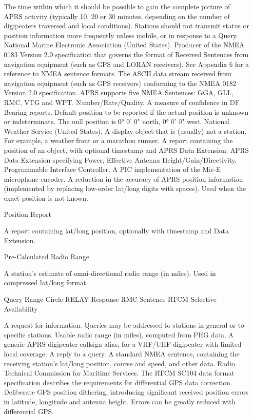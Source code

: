 {The time within which it should be possible to gain the complete picture of APRS
activity (typically 10, 20 or 30 minutes, depending on the number of digipeaters
traversed and local conditions). Stations should not transmit status or position
information more frequently unless mobile, or in response to a Query.
National Marine Electronic Association (United States). Producer of the NMEA 0183
Version 2.0 specification that governs the format of Received Sentences from
navigation equipment (such as GPS and LORAN receivers). See Appendix 6 for a
reference to NMEA sentence formats.
The ASCII data stream received from navigation equipment (such as GPS receivers)
conforming to the NMEA 0182 Version 2.0 specification. APRS supports five NMEA
Sentences: GGA, GLL, RMC, VTG and WPT.
Number/Rate/Quality. A measure of confidence in DF Bearing reports.
Default position to be reported if the actual position is unknown or indeterminate. The
null position is 0° 0' 0" north, 0° 0' 0" west.
National Weather Service (United States).
A display object that is (usually) not a station. For example, a weather front or a
marathon runner.
A report containing the position of an object, with optional timestamp and APRS Data
Extension.
APRS Data Extension specifying Power, Effective Antenna Height/Gain/Directivity.
Programmable Interface Controller.
A PIC implementation of the Mic-E microphone encoder.
A reduction in the accuracy of APRS position information (implemented by replacing
low-order lat/long digits with spaces). Used when the exact position is not known.

Position Report

A report containing lat/long position, optionally with timestamp and Data Extension.

Pre-Calculated Radio Range

A station’s estimate of omni-directional radio range (in miles). Used in compressed
lat/long format.

Query
Range Circle
RELAY
Response
RMC Sentence
RTCM
Selective Availability

A request for information. Queries may be addressed to stations in general or to
specific stations.
Usable radio range (in miles), computed from PHG data.
A generic APRS digipeater callsign alias, for a VHF/UHF digipeater with limited local
coverage.
A reply to a query.
A standard NMEA sentence, containing the receiving station’s lat/long position, course
and speed, and other data.
Radio Technical Commission for Maritime Services. The RTCM SC104 data format
specification describes the requirements for differential GPS data correction.
Deliberate GPS position dithering, introducing significant received position errors in
latitude, longitude and antenna height. Errors can be greatly reduced with differential
GPS.

}
